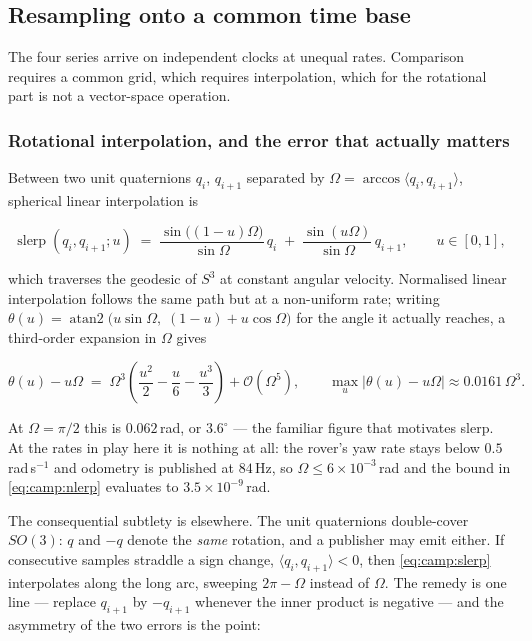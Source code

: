 \subsection{Resampling onto a common time base}
\label{ssec:camp:resample}

The four series arrive on independent clocks at unequal rates. Comparison
requires a common grid, which requires interpolation, which for the rotational
part is not a vector-space operation.

\subsubsection{Rotational interpolation, and the error that actually matters}

Between two unit quaternions $q_i$, $q_{i+1}$ separated by
$\Omega = \arccos\langle q_i, q_{i+1}\rangle$, spherical linear interpolation
is

\begin{equation}
  \operatorname{slerp}(q_i,q_{i+1};u)
  \;=\; \frac{\sin\!\big((1-u)\Omega\big)}{\sin\Omega}\,q_i
      \;+\; \frac{\sin(u\Omega)}{\sin\Omega}\,q_{i+1},
  \qquad u\in[0,1],
  \label{eq:camp:slerp}
\end{equation}

which traverses the geodesic of $S^3$ at constant angular velocity. Normalised
linear interpolation follows the same path but at a non-uniform rate; writing
$\theta(u) = \operatorname{atan2}\!\big(u\sin\Omega,\;(1-u)+u\cos\Omega\big)$
for the angle it actually reaches, a third-order expansion in $\Omega$ gives

\begin{equation}
  \theta(u) - u\Omega
  \;=\; \Omega^3\left(\frac{u^2}{2} - \frac{u}{6} - \frac{u^3}{3}\right)
        + \mathcal{O}(\Omega^5),
  \qquad
  \max_u \big|\theta(u)-u\Omega\big| \approx 0.0161\,\Omega^3 .
  \label{eq:camp:nlerp}
\end{equation}

At $\Omega = \pi/2$ this is $0.062$\,rad, or $3.6^\circ$ --- the familiar
figure that motivates slerp. At the rates in play here it is nothing at all:
the rover's yaw rate stays below $0.5$\,rad\,s$^{-1}$ and odometry is published
at $84$\,Hz, so $\Omega \le 6\times10^{-3}$\,rad and the bound in
\eqref{eq:camp:nlerp} evaluates to $3.5\times10^{-9}$\,rad.

The consequential subtlety is elsewhere. The unit quaternions double-cover
$SO(3)$: $q$ and $-q$ denote the \emph{same} rotation, and a publisher may emit
either. If consecutive samples straddle a sign change,
$\langle q_i,q_{i+1}\rangle < 0$, then \eqref{eq:camp:slerp} interpolates along
the long arc, sweeping $2\pi - \Omega$ instead of $\Omega$. The remedy is one
line --- replace $q_{i+1}$ by $-q_{i+1}$ whenever the inner product is
negative --- and the asymmetry of the two errors is the point:

